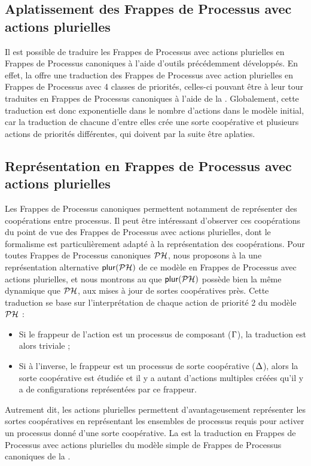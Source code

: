 \subsection{Aplatissement des Frappes de Processus avec actions plurielles}

Il est possible de traduire les Frappes de Processus avec actions plurielles
en Frappes de Processus canoniques à l'aide d'outils précédemment développés.
En effet, la  offre une traduction des Frappes de Processus avec action plurielles
en Frappes de Processus avec 4 classes de priorités, celles-ci pouvant être à leur tour traduites
en Frappes de Processus canoniques à l'aide de la .
Globalement, cette traduction est donc exponentielle dans le nombre d'actions dans le modèle
initial, car la traduction de chacune d'entre elles crée une sorte coopérative et plusieurs
actions de priorités différentes, qui doivent par la suite être aplaties.




\subsection{Représentation en Frappes de Processus avec actions plurielles}

Les Frappes de Processus canoniques permettent notamment de représenter des coopérations
entre processus.
Il peut être intéressant d'observer ces coopérations du point de vue des
Frappes de Processus avec actions plurielles, dont le formalisme est particulièrement
adapté à la représentation des coopérations.
Pour toutes Frappes de Processus canoniques $\mathcal{PH}$, nous proposons à la 
une représentation alternative $\mathsf{plur}(\mathcal{PH})$ de ce modèle en Frappes de Processus avec
actions plurielles, et nous montrons au  que $\mathsf{plur}(\mathcal{PH})$
possède bien la même dynamique que $\mathcal{PH}$, aux mises à jour de sortes coopératives près.
Cette traduction se base sur l'interprétation de chaque action de priorité 2 du modèle $\mathcal{PH}$ :
\begin{itemize}
  \item Si le frappeur de l'action est un processus de composant ($\Gamma$),
    la traduction est alors triviale ;
  \item Si à l'inverse, le frappeur est un processus de sorte coopérative ($\Delta$),
    alors la sorte coopérative est étudiée et il y a autant d'actions multiples
    créées qu'il y a de configurations représentées par ce frappeur.
\end{itemize}
Autrement dit, les actions plurielles permettent d'avantageusement représenter
les sortes coopératives en représentant les ensembles de processus requis pour activer
un processus donné d'une sorte coopérative.
La  est la traduction en Frappes de Processus avec actions plurielles
du modèle simple de Frappes de Processus canoniques de la .

